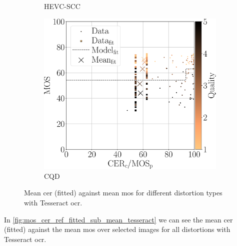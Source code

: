 \begin{figure}[h]
\begin{subfigure}[b]{0.3\textwidth}
        \caption{HEVC-SCC}
        \label{fig:mos_cer_ref_fitted_mean_tess_HEVC-SCC}
    \end{subfigure}
    \hfill
    \begin{subfigure}[b]{0.3\textwidth}
        \includegraphics[width=\textwidth]{../../images/analyze/mos_cer_ref_fitted_mean_tess_CQD.pdf}
        \caption{CQD}
        \label{fig:mos_cer_ref_fitted_mean_tess_CQD}
    \end{subfigure}
    \caption{Mean \gls{cer} (fitted) against mean \gls{mos} for different distortion types with Tesseract \gls{ocr}.}
\label{fig:mos_cer_ref_fitted_mean_tess}
\end{figure}

In \autoref{fig:mos_cer_ref_fitted_sub_mean_tesseract} we can see the mean \gls{cer} (fitted) against the mean \gls{mos} over selected images for all distortions with Tesseract \gls{ocr}.

